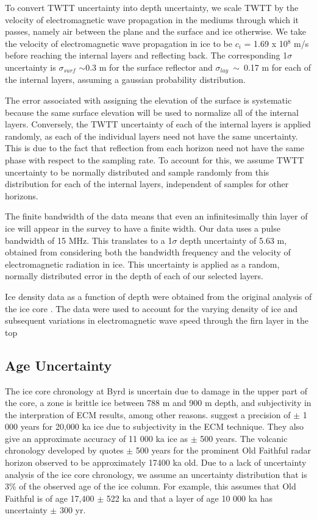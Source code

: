 \documentclass[12pt]{article}
\begin{document}
To convert TWTT uncertainty into depth uncertainty, we scale TWTT by the velocity of electromagnetic wave propagation in the mediums through which it passes, namely air between the plane and the surface and ice otherwise. We take the velocity of electromagnetic wave propagation in ice to be $\textit{c}_i$ = 1.69 x 10$^8$ m/s before reaching the internal layers and reflecting back. The corresponding 1$\sigma$ uncertainty is $\sigma_{surf}$ $\sim$0.3 m for the surface reflector and $\sigma_{lay}~\sim~$0.17 m for each of the internal layers, assuming a gaussian probability distribution.
 
The error associated with assigning the elevation of the surface is systematic because the same surface elevation will be used to normalize all of the internal layers. Conversely, the TWTT uncertainty of each of the internal layers is applied randomly, as each of the individual layers need not have the same uncertainty. This is due to the fact that reflection from each horizon need not  have the same phase with respect to the sampling rate. To account for this, we assume TWTT uncertainty to be normally distributed and sample randomly from this distribution for each of the internal layers, independent of samples for other horizons.

The finite bandwidth of the data means that even an infinitesimally thin layer of ice will appear in the survey to have a finite width. Our data uses a pulse bandwidth of 15 MHz. This translates to a 1$\sigma$ depth uncertainty of 5.63 m, obtained from considering both the bandwidth frequency and the velocity of electromagnetic radiation in ice. This uncertainty is applied as a random, normally distributed error in the depth of each of our selected layers. 

Ice density data as a function of depth were obtained from the original analysis of the ice core \citep{gow68}. The data were used to account for the varying density of ice and subsequent variations in electromagnetic wave speed through the firn layer in the top 


\subsection{Age Uncertainty}\label{ageunc}

The ice core chronology at Byrd is uncertain due to damage in the upper part of the core, a zone is brittle ice between 788 m and 900 m depth, and subjectivity in the interpration of ECM results, among other reasons. \citet{hammer94} suggest a precision of $\pm$ 1 000 years for 20,000 ka ice due to subjectivity in the ECM technique. They also give an approximate accuracy of 11 000 ka ice as $\pm$ 500 years. The volcanic chronology developed by \citet{hammer97} quotes $\pm$ 500 years for the prominent Old Faithful radar horizon observed to be approximately 17400 ka old. Due to a lack of uncertainty analysis of the ice core chronology, we assume an uncertainty distribution that is 3\% of the observed age of the ice column. For example, this assumes that Old Faithful is of age 17,400 $\pm$ 522 ka and that a layer of age 10 000 ka has uncertainty $\pm$ 300 yr. 
\end{document}
